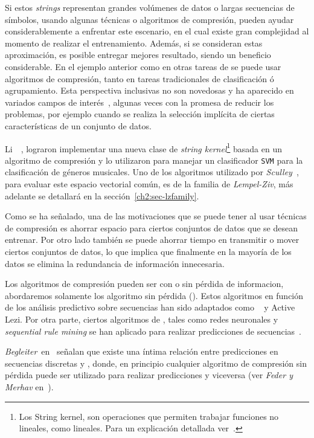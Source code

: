 Si estos \emph{strings} representan grandes volúmenes de datos o largas secuencias de símbolos, usando algunas técnicas o algoritmos de compresión, pueden ayudar considerablemente a enfrentar este escenario, en el cual existe gran complejidad al momento de realizar el entrenamiento. Además, si se consideran estas aproximación, es posible entregar mejores resultado, siendo un beneficio considerable. En el ejemplo anterior como en otras tareas de \machinelearning se puede usar algoritmos de compresión, tanto en tareas tradicionales de clasificación ó agrupamiento.  Esta perspectiva inclusivas no son novedosas y ha aparecido en variados campos de interés~\cite{Sculley2006}, algunas veces con la promesa de reducir los problemas, por ejemplo cuando se realiza la selección implícita de ciertas características de un conjunto de datos. 

Li~\etal~\cite{Li2005}, lograron implementar una nueva clase de \emph{string kernel}\footnote{Los String kernel, son operaciones que permiten trabajar funciones no lineales, como lineales. Para un explicación detallada ver~\cite{Li2005}.} basada en un algoritmo de compresión y lo utilizaron para manejar un clasificador \texttt{SVM} para la clasificación de géneros musicales. Uno de los algoritmos utilizado por \emph{Sculley}~\cite{Sculley2006}, para evaluar este espacio vectorial común, es de la familia de \emph{Lempel-Ziv}, más adelante se detallará en la  sección~\ref{ch2:sec-lzfamily}.

Como se ha señalado, una de las motivaciones que se puede tener al usar técnicas de compresión es ahorrar espacio para ciertos conjuntos de datos que se desean entrenar. Por otro lado también se puede ahorrar tiempo en transmitir o mover ciertos conjuntos de datos, lo que implica que finalmente en la mayoría de los datos se elimina la redundancia de información innecesaria.

Los algoritmos de compresión pueden ser con o sin pérdida de informacion, abordaremos solamente los algoritmo sin pérdida (\losslessdatacompression). Estos algoritmos en función de los análisis predictivo sobre secuencias han sido adaptados como \lzSieteOcho~\cite{ZivLempel1978} y Active Lezi\cite{Gopalratnam2007}. Por otra parte, ciertos algoritmos de \machinelearning, tales como redes neuronales y \emph{sequential rule mining} se han aplicado para realizar predicciones de secuencias~\cite{Gueniche2015}.

\emph{Begleiter}~\etal en~\cite{Begleiter2004} señalan que existe una  íntima relación entre predicciones  en secuencias discretas y \losslessdatacompression, donde, en principio cualquier algoritmo de compresión sin pérdida puede ser utilizado para realizar predicciones y viceversa (ver \emph{Feder y Merhav} en~\cite{Feder1992}).

